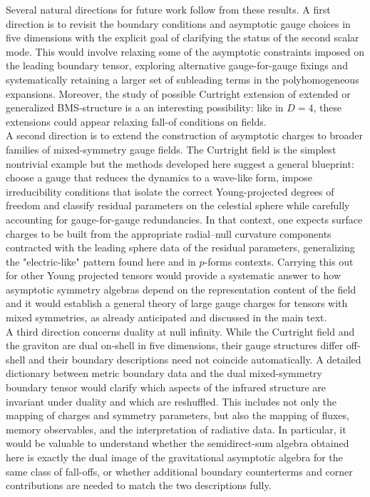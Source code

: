 \documentclass[a4paper,12pt]{article}
\begin{document}
Several natural directions for future work follow from these results. A first direction is to revisit the boundary conditions and asymptotic gauge choices in five dimensions with the explicit goal of clarifying the status of the second scalar mode. This would involve relaxing some of the asymptotic constraints imposed on the leading boundary tensor, exploring alternative gauge-for-gauge fixings and systematically retaining a larger set of subleading terms in the polyhomogeneous expansions. Moreover, the study of possible Curtright extension of extended or generalized BMS-structure is a an interesting possibility: like in $D=4$, these extensions could appear relaxing fall-of conditions on fields.\\
A second direction is to extend the construction of asymptotic charges to broader families of mixed-symmetry gauge fields. The Curtright field is the simplest nontrivial example but the methods developed here suggest a general blueprint: choose a gauge that reduces the dynamics to a wave-like form, impose irreducibility conditions that isolate the correct Young-projected degrees of freedom and classify residual parameters on the celestial sphere while carefully accounting for gauge-for-gauge redundancies. In that context, one expects surface charges to be built from the appropriate radial--null curvature components contracted with the leading sphere data of the residual parameters, generalizing the "electric-like" pattern found here and in $p$-forms contexts. Carrying this out for other Young projected tensors would provide a systematic answer to how asymptotic symmetry algebras depend on the representation content of the field and it would establish a general theory of large gauge charges for tensors with mixed symmetries, as already anticipated and discussed in the main text.\\
A third direction concerns duality at null infinity. While the Curtright field and the graviton are dual on-shell in five dimensions, their gauge structures differ off-shell and their boundary descriptions need not coincide automatically. A detailed dictionary between metric boundary data and the dual mixed-symmetry boundary tensor would clarify which aspects of the infrared structure are invariant under duality and which are reshuffled. This includes not only the mapping of charges and symmetry parameters, but also the mapping of fluxes, memory observables, and the interpretation of radiative data. In particular, it would be valuable to understand whether the semidirect-sum algebra obtained here is exactly the dual image of the gravitational asymptotic algebra for the same class of fall-offs, or whether additional boundary counterterms and corner contributions are needed to match the two descriptions fully.\\
\end{document}
